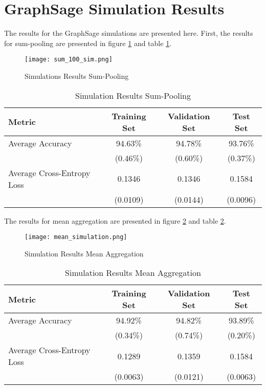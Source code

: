 
  \section[Simulations]{GraphSage Simulation Results}
  \label{App:sim_results}

  The results for the GraphSage simulations are presented here. First, the
  results for sum-pooling are presented in figure \ref{fig:sum_sim} and table
  \ref{table:sum_sim}.

  \begin{figure}[htbp!]
		\centering
		\texttt{[image: sum\_100\_sim.png]}
		\caption{Simulations Results Sum-Pooling}
        \label{fig:sum_sim}
  \end{figure}

  \begin{table}[h]
    \centering
      \begin{tabular}{|l||c|c|c|}
      \hline
      \textbf{Metric} & \textbf{Training Set} & \textbf{Validation Set} & 
      \textbf{Test Set}\\
      \hline\hline
      Average Accuracy & 94.63\% & 94.78\% & 93.76\% \\\hline 
                       & (0.46\%) & (0.60\%) & (0.37\%) \\\hline
      Average Cross-Entropy Loss & 0.1346 & 0.1346 & 0.1584 \\\hline
                                 & (0.0109) & (0.0144) & (0.0096) \\
      \hline
    \end{tabular}
    \caption{Simulation Results Sum-Pooling}
    \label{table:sum_sim}
  \end{table}

  \noindent The results for mean aggregation are presented in figure 
  \ref{fig:mean_sim} and table \ref{table:mean_sim}.

  \begin{figure}[h]
		\centering
		\texttt{[image: mean\_simulation.png]}
		\caption{Simulation Results Mean Aggregation}
        \label{fig:mean_sim}
  \end{figure}

  \begin{table}[h]
    \centering
      \begin{tabular}{|l||c|c|c|}
      \hline
      \textbf{Metric} & \textbf{Training Set} & \textbf{Validation Set} & 
      \textbf{Test Set}\\
      \hline\hline
      Average Accuracy & 94.92\% & 94.82\% & 93.89\% \\\hline 
                       & (0.34\%) & (0.74\%) & (0.20\%) \\\hline
      Average Cross-Entropy Loss & 0.1289 & 0.1359 & 0.1584 \\\hline
                                 & (0.0063) & (0.0121) & (0.0063) \\
      \hline
    \end{tabular}
    \caption{Simulation Results Mean Aggregation}
    \label{table:mean_sim}
  \end{table}

